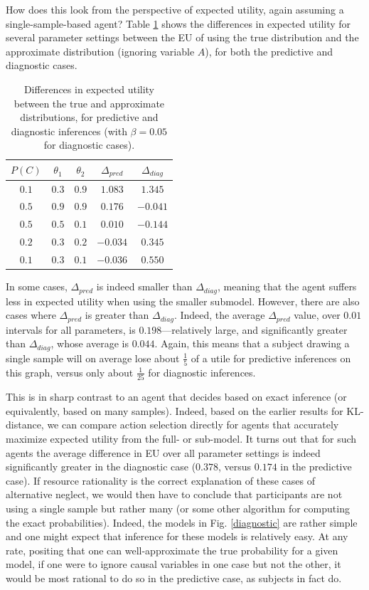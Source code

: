 \documentclass[10pt,letterpaper]{article}
\begin{document}
How does this look from the perspective of expected utility, again assuming a single-sample-based agent?  Table \ref{predictive} shows the differences in expected utility for several parameter settings between the EU of using the true distribution and the approximate distribution (ignoring variable $A$), for both the predictive and diagnostic cases. 
\begin{table}[h]  \begin{center}
\begin{tabular}{c | c | c || c | c}
 $P(C)$ & $\theta_1$ & $\theta_2$ & $\Delta_{pred}$ & $\Delta_{diag}$ \\ \hline
  $0.1$ & $0.3$ & $0.9$ & $1.083$ & $1.345$ \\
 $0.5$ & $0.9$ &  $0.9$ & $0.176$ & $-0.041$ \\
 $0.5$ & $0.5$ & $0.1$ & $0.010$ & $-0.144$ \\
  $0.2$ & $0.3$ & $0.2$ & $-0.034$ & $0.345$ \\
 $0.1$ & $0.3$ & $0.1$ & $-0.036$ & $0.550$ \\

\end{tabular} \end{center} \caption{Differences in expected utility between the true and approximate distributions, for predictive and diagnostic inferences (with $\beta = 0.05$ for diagnostic cases).} \label{predictive}
\end{table} 
In some cases, $\Delta_{pred}$ is indeed smaller than $\Delta_{diag}$, meaning that the agent suffers less in expected utility when using the smaller submodel. However, there are also cases where $\Delta_{pred}$ is greater than $\Delta_{diag}$. Indeed, the average $\Delta_{pred}$ value, over $0.01$ intervals for all parameters, is $0.198$---relatively large, and significantly greater than $\Delta_{diag}$, whose average is $0.044$. Again, this means that a subject drawing a single sample will on average lose about $\frac{1}{5}$ of a utile for predictive inferences on this graph, versus only about $\frac{1}{25}$ for diagnostic inferences.

This is in sharp contrast to an agent that decides based on exact inference (or equivalently, based on many samples).
Indeed, based on the earlier results for KL-distance, we can compare action selection directly for agents that accurately maximize expected utility from the full- or sub-model.
It turns out that for such agents the average difference in EU over all parameter settings is indeed significantly greater in the diagnostic case ($0.378$, versus $0.174$ in the predictive case).
If resource rationality is the correct explanation of these cases of alternative neglect, we would then have to conclude that participants are not using a single sample but rather many (or some other algorithm for computing the exact probabilities).
Indeed, the models in Fig. \ref{diagnostic} are rather simple and one might expect that inference for these models is relatively easy.
At any rate, positing that one can well-approximate the true probability for a given model, if one were to ignore causal variables in one case but not the other, it would be most rational to do so in the predictive case, as subjects in fact do. 
\end{document}
